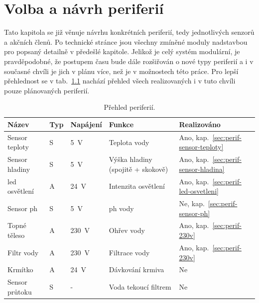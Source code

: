 \chapter{Volba a návrh periferií}
    Tato kapitola se již věnuje návrhu konkrétních periferií, tedy jednotlivých senzorů a akčních členů. Po technické stránce jsou všechny zmíněné moduly nadstavbou pro  popsaný detailně v předešlé kapitole. Jelikož je celý systém modulární, je pravděpodobné, že postupem času bude dále rozšiřován o nové typy periferií a i v současné chvíli je jich v plánu více, než je v možnostech této práce. Pro lepší přehlednost se v tab.~\ref{tab:prehled-periferii} nachází přehled všech realizovaných i v tuto chvíli pouze plánovaných periferií.

    \begin{table}[h]
        \centering
        \caption{Přehled periferií.}
        \label{tab:prehled-periferii}
        \begin{tabular}{|l|l|l|l|l|}
            \hline
            Název & Typ & Napájení & Funkce & Realizováno \\ \hline\hline
            Sensor teploty  & S & \qty{5}{V}    & Teplota vody                       & Ano, kap.~\ref{sec:perif-sensor-teploty}  \\ \hline
            Sensor hladiny  & S & \qty{5}{V}    & Výška hladiny (spojitě + skokově)  & Ano, kap.~\ref{sec:perif-sensor-hladina}  \\ \hline
            \acs{led} osvětlení   & A & \qty{24}{V}   & Intenzita osvětlení                & Ano, kap.~\ref{sec:perif-led-osvetleni}  \\ \hline
            Sensor \acs{ph}       & S & \qty{5}{V}    & \acs{ph} vody                            & Ne, kap.~\ref{sec:perif-sensor-ph}  \\ \hline
            Topné těleso    & A & \qty{230}{V}  & Ohřev vody                         & Ano, kap.~\ref{sec:perif-230v}  \\ \hline
            Filtr vody      & A & \qty{230}{V}  & Filtrace vody                      & Ano, kap.~\ref{sec:perif-230v}  \\ \hline
            Krmítko         & A & \qty{24}{V}   & Dávkování krmiva                   & Ne  \\ \hline
            Sensor průtoku  & S & -             & Voda tekoucí filtrem               & Ne  \\ \hline

\end{tabular}
\end{table}
